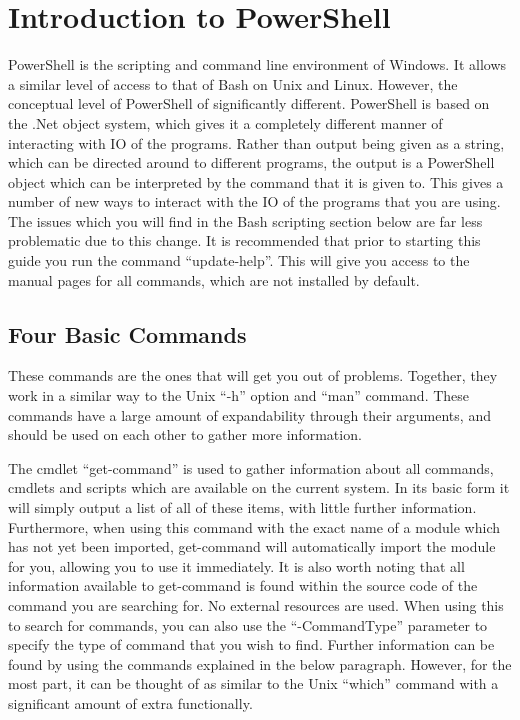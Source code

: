 	\section{Introduction to PowerShell}
		PowerShell is the scripting and command line environment of Windows.\cite{EffectivePS}
		It allows a similar level of access to that of Bash on Unix and Linux.
		However, the conceptual level of PowerShell of significantly different.
		PowerShell is based on the .Net object system, which gives it a completely different manner of interacting with IO of the programs.
		Rather than output being given as a string, which can be directed around to different programs, the output is a PowerShell object which can be interpreted by the command that it is given to.
		This gives a number of new ways to interact with the IO of the programs that you are using.
		The issues which you will find in the Bash scripting section below are far less problematic due to this change.
		It is recommended that prior to starting this guide you run the command ``update-help''.
		This will give you access to the manual pages for all commands, which are not installed by default.
		\subsection{Four Basic Commands}
			These commands are the ones that will get you out of problems.
			Together, they work in a similar way to the Unix ``-h'' option and ``man'' command.
			These commands have a large amount of expandability through their arguments, and should be used on each other to gather more information.

			The cmdlet ``get-command'' is used to gather information about all commands, cmdlets and scripts which are available on the current system.
			In its basic form it will simply output a list of all of these items, with little further information.
			Furthermore, when using this command with the exact name of a module which has not yet been imported, get-command will automatically import the module for you, allowing you to use it immediately.
			It is also worth noting that all information available to get-command is found within the source code of the command you are searching for.
			No external resources are used.
			When using this to search for commands, you can also use the ``-CommandType'' parameter to specify the type of command that you wish to find.
			Further information can be found by using the commands explained in the below paragraph.
			However, for the most part, it can be thought of as similar to the Unix ``which'' command with a significant amount of extra functionally.

